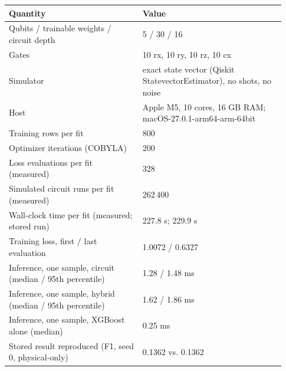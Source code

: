 \begin{tabular}{p{0.45\linewidth}p{0.48\linewidth}}
\toprule
Quantity & Value \\
\midrule
Qubits / trainable weights / circuit depth & 5 / 30 / 16 \\
Gates & 10 rx, 10 ry, 10 rz, 10 cx \\
Simulator & exact state vector (Qiskit StatevectorEstimator), no shots, no noise \\
Host & Apple M5, 10 cores, 16 GB RAM; macOS-27.0.1-arm64-arm-64bit \\
Training rows per fit & 800 \\
Optimizer iterations (COBYLA) & 200 \\
Loss evaluations per fit (measured) & 328 \\
Simulated circuit runs per fit (measured) & 262\,400 \\
Wall-clock time per fit (measured; stored run) & 227.8 s; 229.9 s \\
Training loss, first / last evaluation & 1.0072 / 0.6327 \\
Inference, one sample, circuit (median / 95th percentile) & 1.28 / 1.48 ms \\
Inference, one sample, hybrid (median / 95th percentile) & 1.62 / 1.86 ms \\
Inference, one sample, XGBoost alone (median) & 0.25 ms \\
Stored result reproduced (F1, seed 0, physical-only) & 0.1362 vs. 0.1362 \\
\bottomrule
\end{tabular}
